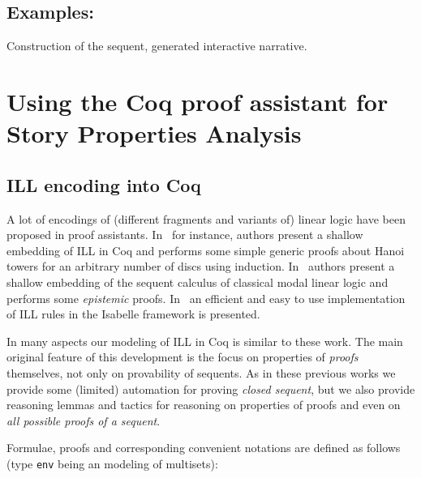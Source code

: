 \documentclass[runningheads,a4paper]{llncs}
\begin{document}
\subsection{Examples:} Construction of the sequent, generated interactive narrative.
\section{Using the Coq proof assistant for Story Properties Analysis}
\subsection{ILL encoding into Coq}

A lot of encodings of (different fragments and variants of) linear
logic have been proposed in proof assistants. In~\cite{Power99} for
instance, authors present a shallow embedding of ILL in Coq and
performs some simple generic proofs about Hanoi towers for an
arbitrary number of discs using induction.
In~\cite{Sadrzadeh03modallinear} authors present a shallow embedding
of the sequent calculus of classical modal linear logic and performs
some \emph{epistemic} proofs. In~\cite{Kalvala95mechanizinglinear} an
efficient and easy to use implementation of ILL rules in the Isabelle
framework is presented.

In many aspects our modeling of ILL in Coq is similar to these work.
The main original feature of this development is the focus on
properties of \emph{proofs} themselves, not only on provability of
sequents. As in these previous works we provide some (limited)
automation for proving \emph{closed sequent}, but we also provide reasoning lemmas and tactics
for reasoning on properties of proofs and even on \emph{all possible
  proofs of a sequent}. 

Formulae, proofs and corresponding convenient notations are defined as
follows (type \texttt{env} being an modeling of multisets):
\end{document}
